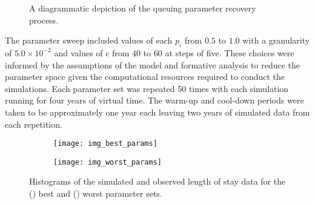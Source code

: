 \begin{figure}
{
    }
    \caption{%
        A diagrammatic depiction of the queuing parameter recovery process.
    }\label{fig:process}
\end{figure}

The parameter sweep included values of each \(p_i\) from \(0.5\) to \(1.0\) with
a granularity of \(5.0 \times 10^{-2}\) and values of \(c\) from \(40\) to
\(60\) at steps of five. These choices were informed by the assumptions of the
model and formative analysis to reduce the parameter space given the
computational resources required to conduct the simulations. Each parameter set
was repeated 50 times with each simulation running for four years of virtual
time. The warm-up and cool-down periods were taken to be approximately one year
each leaving two years of simulated data from each repetition.

\begin{figure}
    \centering%
    \begin{subfigure}{.5\imgwidth}
        \texttt{[image: img\_best\_params]}
        \caption{}\label{fig:best_params}
    \end{subfigure}\hfill%
    \begin{subfigure}{.5\imgwidth}
        \texttt{[image: img\_worst\_params]}
        \caption{}\label{fig:worst_params}
    \end{subfigure}
    \caption{Histograms of the simulated and observed length of stay data for
             the () best and ()
             worst parameter sets.}\label{fig:params}
\end{figure}

